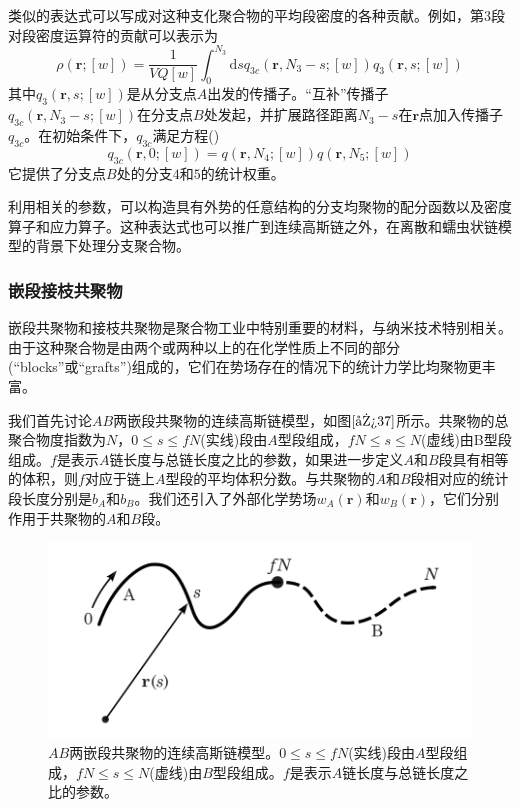 类似的表达式可以写成对这种支化聚合物的平均段密度的各种贡献。例如，第$3$段对段密度运算符的贡献可以表示为
\begin{equation}
\rho(\mathbf{r};[w])=\frac{1}{VQ[w]}\int _{0}^{N_3} \mathrm{d}sq_{3c}(\mathbf{r},N_3-s;[w])q_3(\mathbf{r},s;[w])
\end{equation}
其中$q_3(\mathbf{r},s;[w])$是从分支点$A$出发的传播子。“互补”传播子$q_{3c}(\mathbf{r},N_3-s;[w])$在分支点$B$处发起，并扩展路径距离$N_3-s$在$\mathbf{r}$点加入传播子$q_{3c}$。在初始条件下，$q_{3c}$满足方程(\label{传播子求导})
\begin{equation}
q_{3c}(\mathbf{r},0;[w])=q(\mathbf{r},N_4;[w])q(\mathbf{r},N_5;[w])
\end{equation}
它提供了分支点$B$处的分支$4$和$5$的统计权重。

利用相关的参数，可以构造具有外势的任意结构的分支均聚物的配分函数以及密度算子和应力算子。这种表达式也可以推广到连续高斯链之外，在离散和蠕虫状链模型的背景下处理分支聚合物。

\subsubsection{嵌段接枝共聚物}
嵌段共聚物和接枝共聚物是聚合物工业中特别重要的材料，与纳米技术特别相关。由于这种聚合物是由两个或两种以上的在化学性质上不同的部分(“blocks”或“grafts”)组成的，它们在势场存在的情况下的统计力学比均聚物更丰富。

我们首先讨论$AB$两嵌段共聚物的连续高斯链模型，如图$\ref{图37}$所示。共聚物的总聚合物度指数为$N$，$0\leq s \leq fN$(实线)段由$A$型段组成，$fN \leq s \leq N$(虚线)由B型段组成。$f$是表示$A$链长度与总链长度之比的参数，如果进一步定义$A$和$B$段具有相等的体积，则$f$对应于链上$A$型段的平均体积分数。与共聚物的$A$和$B$段相对应的统计段长度分别是$b_A$和$b_B$。我们还引入了外部化学势场$w_A(\mathbf{r})$和$w_B(\mathbf{r})$，它们分别作用于共聚物的$A$和$B$段。

\begin{figure}[H]
\centering
\includegraphics[scale=0.7]{./figures/37.png}
\caption{$AB$两嵌段共聚物的连续高斯链模型。$0\leq s \leq fN$(实线)段由$A$型段组成，$fN \leq s \leq N$(虚线)由$B$型段组成。$f$是表示$A$链长度与总链长度之比的参数。}
\label{图37}
\end{figure}

